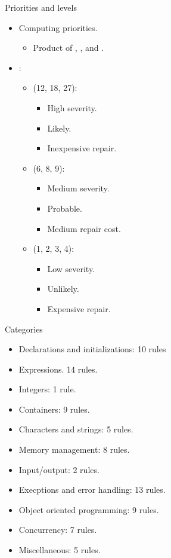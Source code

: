 \begin{frame}[t]{Priorities and levels}
\begin{itemize}
  \item Computing priorities.
    \begin{itemize}
      \item Product of , , and 
            .
    \end{itemize}

  \vfill\pause
  \item {}:
    \begin{itemize}
      \item {} (12, 18, 27): 
        \begin{itemize}
          \item High severity.
          \item Likely.
          \item Inexpensive repair.
        \end{itemize}
      \item {} (6, 8, 9): 
        \begin{itemize}
          \item Medium severity.
          \item Probable.
          \item Medium repair cost.
        \end{itemize}
      \item {} (1, 2, 3, 4): 
        \begin{itemize}
          \item Low severity.
          \item Unlikely.
          \item Expensive repair.
        \end{itemize}
    \end{itemize}
\end{itemize}
\end{frame}

\begin{frame}[t]{Categories}
\begin{itemize}
  \item {} Declarations and initializations: 10 rules
  \item {} Expressions. 14 rules.
  \item {} Integers: 1 rule.
  \item {} Containers: 9 rules.
  \item {} Characters and strings: 5 rules.
  \item {} Memory management: 8 rules.
  \item {} Input/output: 2 rules.
  \item {} Execptions and error handling: 13 rules.
  \item {} Object oriented programming: 9 rules.
  \item {} Concurrency: 7 rules.
  \item {} Miscellaneous: 5 rules.
\end{itemize}
\end{frame} 
